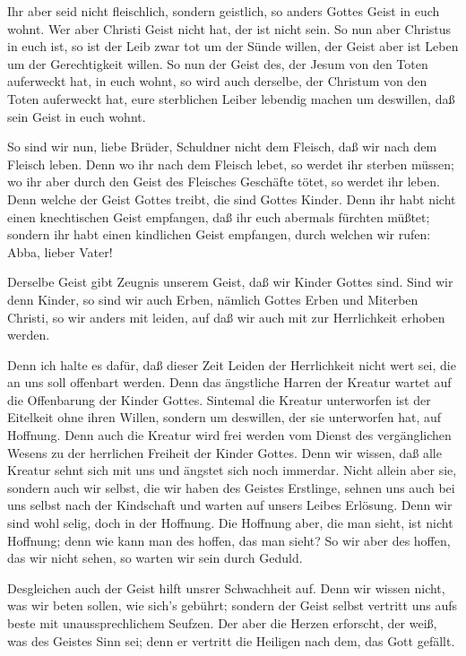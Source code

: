  Ihr aber seid nicht fleischlich, sondern geistlich, so
anders Gottes Geist in euch wohnt. Wer aber Christi Geist nicht hat, der
ist nicht sein.  So nun aber Christus in euch ist, so ist
der Leib zwar tot um der Sünde willen, der Geist aber ist Leben um der
Gerechtigkeit willen.  So nun der Geist des, der Jesum von
den Toten auferweckt hat, in euch wohnt, so wird auch derselbe, der
Christum von den Toten auferweckt hat, eure sterblichen Leiber lebendig
machen um deswillen, daß sein Geist in euch wohnt.

 So sind wir nun, liebe Brüder, Schuldner nicht dem
Fleisch, daß wir nach dem Fleisch leben.  Denn wo ihr nach
dem Fleisch lebet, so werdet ihr sterben müssen; wo ihr aber durch den
Geist des Fleisches Geschäfte tötet, so werdet ihr leben. 
Denn welche der Geist Gottes treibt, die sind Gottes Kinder.
 Denn ihr habt nicht einen knechtischen Geist empfangen,
daß ihr euch abermals fürchten müßtet; sondern ihr habt einen kindlichen
Geist empfangen, durch welchen wir rufen: Abba, lieber Vater!

 Derselbe Geist gibt Zeugnis unserem Geist, daß wir Kinder
Gottes sind.  Sind wir denn Kinder, so sind wir auch Erben,
nämlich Gottes Erben und Miterben Christi, so wir anders mit leiden, auf
daß wir auch mit zur Herrlichkeit erhoben werden.

 Denn ich halte es dafür, daß dieser Zeit Leiden der
Herrlichkeit nicht wert sei, die an uns soll offenbart werden.
 Denn das ängstliche Harren der Kreatur wartet auf die
Offenbarung der Kinder Gottes.  Sintemal die Kreatur
unterworfen ist der Eitelkeit ohne ihren Willen, sondern um deswillen,
der sie unterworfen hat, auf Hoffnung.  Denn auch die
Kreatur wird frei werden vom Dienst des vergänglichen Wesens zu der
herrlichen Freiheit der Kinder Gottes.  Denn wir wissen,
daß alle Kreatur sehnt sich mit uns und ängstet sich noch immerdar.
 Nicht allein aber sie, sondern auch wir selbst, die wir
haben des Geistes Erstlinge, sehnen uns auch bei uns selbst nach der
Kindschaft und warten auf unsers Leibes Erlösung.  Denn wir
sind wohl selig, doch in der Hoffnung. Die Hoffnung aber, die man sieht,
ist nicht Hoffnung; denn wie kann man des hoffen, das man sieht?
 So wir aber des hoffen, das wir nicht sehen, so warten wir
sein durch Geduld.

 Desgleichen auch der Geist hilft unsrer Schwachheit auf.
Denn wir wissen nicht, was wir beten sollen, wie sich's gebührt; sondern
der Geist selbst vertritt uns aufs beste mit unaussprechlichem Seufzen.
 Der aber die Herzen erforscht, der weiß, was des Geistes
Sinn sei; denn er vertritt die Heiligen nach dem, das Gott gefällt.

